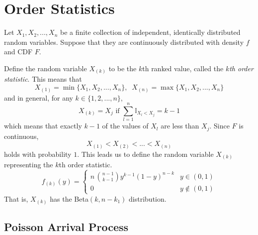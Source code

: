 \section{Order Statistics}

  Let $X_1, X_2, ..., X_n$ be a finite collection of independent, identically distributed random variables. Suppose that they are continuously distributed with density $f$ and CDF $F$. 

  \begin{definition}
    Define the random variable $X_{(k)}$ to be the $k$th ranked value, called the \textit{$k$th order statistic}. This means that 
    \begin{equation}
      X_{(1)} = \min\{X_1, X_2, ..., X_n\}, \;\; X_{(n)} = \max\{X_1, X_2, ..., X_n\}
    \end{equation}
    and in general, for any $k \in \{1, 2, ..., n\}$, 
    \begin{equation}
      X_{(k)} = X_j \text{ if } \sum_{l=1}^n \mathbb{I}_{X_l < X_j} = k - 1
    \end{equation}
    which means that exactly $k-1$ of the values of $X_l$ are less than $X_j$. Since $F$ is continuous, 
    \begin{equation}
      X_{(1)} < X_{(2)} < ... < X_{(n)}
    \end{equation}
    holds with probability $1$. This leads us to define the random variable $X_{(k)}$ representing the $k$th order statistic.
    \begin{equation}
      f_{(k)} (y) = \begin{cases} 
        n \, \binom{n-1}{k-1} y^{k-1} (1-y)^{n-k} & y \in (0, 1) \\
      0 & y \not\in (0,1)
      \end{cases}
    \end{equation}
    That is, $X_{(k)}$ has the Beta$(k, n-k_1)$ distribution. 
  \end{definition}

\subsection{Poisson Arrival Process}

